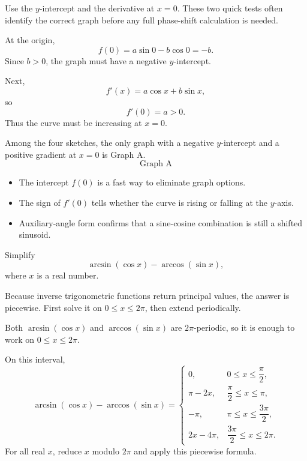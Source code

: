 \begin{hintbox}
Use the $y$-intercept and the derivative at $x=0$. These two quick tests often
identify the correct graph before any full phase-shift calculation is needed.
\end{hintbox}

\begin{solution}
At the origin,
\[
f(0)=a\sin0-b\cos0=-b.
\]
Since $b>0$, the graph must have a negative $y$-intercept.

Next,
\[
f'(x)=a\cos x+b\sin x,
\]
so
\[
f'(0)=a>0.
\]
Thus the curve must be increasing at $x=0$.

Among the four sketches, the only graph with a negative $y$-intercept and a
positive gradient at $x=0$ is Graph A.
\[
\boxed{\text{Graph A}}
\]
\end{solution}

\begin{takeaways}
\begin{itemize}[leftmargin=*]
  \item The intercept $f(0)$ is a fast way to eliminate graph options.
  \item The sign of $f'(0)$ tells whether the curve is rising or falling at the
        $y$-axis.
  \item Auxiliary-angle form confirms that a sine-cosine combination is still a
        shifted sinusoid.
\end{itemize}
\end{takeaways}

\begin{problem}
Simplify
\[
\arcsin(\cos x)-\arccos(\sin x),
\]
where $x$ is a real number.
\end{problem}

\begin{hintbox}
Because inverse trigonometric functions return principal values, the answer is
piecewise. First solve it on $0\le x\le2\pi$, then extend periodically.
\end{hintbox}

\begin{solution}
Both $\arcsin(\cos x)$ and $\arccos(\sin x)$ are $2\pi$-periodic, so it is
enough to work on $0\le x\le2\pi$.

On this interval,
\[
\arcsin(\cos x)-\arccos(\sin x)
=
\begin{cases}
0, & 0\le x\le \dfrac{\pi}{2},\\[6pt]
\pi-2x, & \dfrac{\pi}{2}\le x\le \pi,\\[6pt]
-\pi, & \pi\le x\le \dfrac{3\pi}{2},\\[6pt]
2x-4\pi, & \dfrac{3\pi}{2}\le x\le2\pi.
\end{cases}
\]
For all real $x$, reduce $x$ modulo $2\pi$ and apply this piecewise formula.
\end{solution}


